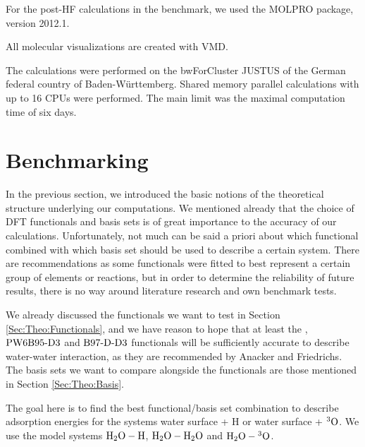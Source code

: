 For the post-HF calculations in the benchmark, we used the MOLPRO
package, version 2012.1.\cite{MOLPRO_brief}

All molecular visualizations are created with VMD.\cite{HUMP96}

The calculations were performed on the bwForCluster JUSTUS of the German
federal country of Baden-Württemberg.\cite{JUSTUS} Shared memory parallel
calculations with up to 16 CPUs were performed. The main limit was the maximal
computation time of six days.



\section{Benchmarking}
\newcommand\htohto{\mbox{\enmat{\hto-\hto}}}
\newcommand\htoo{\mbox{\enmat{\hto-\hspace{.2pt} ^3\te{O}}}}
\newcommand\htoh{\mbox{\enmat{\hto-\te H}}}
\label{Sec:Bench}

In the previous section, we introduced the basic notions of the theoretical
structure underlying our computations. We mentioned already that the choice
of DFT functionals and basis sets is of great importance to the accuracy of our calculations. Unfortunately, not much can be said a priori about
which functional combined with which basis set should be used to describe a certain system.
There are recommendations as some functionals were fitted to best represent a certain
group of elements or reactions, but in order to determine the reliability of
future results, there is no way around literature research and own benchmark
tests.

We already
discussed the functionals we want to test in Section \ref{Sec:Theo:Functionals}, and we
have reason to hope that at least the \pbez, $\text{PW6B95}\text{-D3}$ and $\text{B97-D}\text{-D3}$ functionals will be sufficiently
accurate to describe water-water interaction, as they are recommended by Anacker
and Friedrichs. \cite{Anacker2014} The basis sets we want to compare alongside
the functionals are those mentioned in Section \ref{Sec:Theo:Basis}.

The goal here is to find the best functional/basis set combination to describe
adsorption energies for the systems water surface + H or water surface +
${^3\text{O}}$. We use the model systems $\htoh$, $\htohto$ and $\htoo$.

